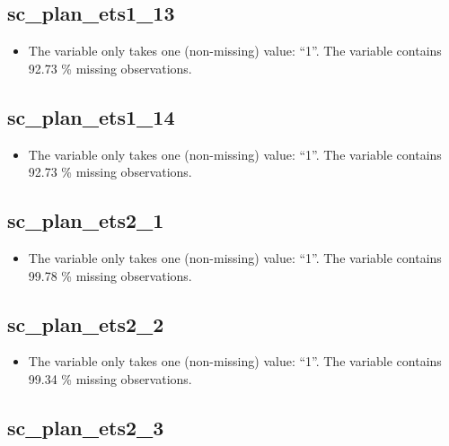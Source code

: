 \documentclass[
  letterpaper,
  DIV=11,
  numbers=noendperiod]{scrartcl}
\providecommand{\tightlist}{%
  \setlength{\itemsep}{0pt}\setlength{\parskip}{0pt}}
\begin{document}
\fullline

\subsection{sc\_plan\_ets1\_13}\label{sc_plan_ets1_13}

\begin{itemize}
\tightlist
\item
  The variable only takes one (non-missing) value: ``1''. The variable
  contains 92.73 \% missing observations.
\end{itemize}

\fullline

\subsection{sc\_plan\_ets1\_14}\label{sc_plan_ets1_14}

\begin{itemize}
\tightlist
\item
  The variable only takes one (non-missing) value: ``1''. The variable
  contains 92.73 \% missing observations.
\end{itemize}

\fullline

\subsection{sc\_plan\_ets2\_1}\label{sc_plan_ets2_1}

\begin{itemize}
\tightlist
\item
  The variable only takes one (non-missing) value: ``1''. The variable
  contains 99.78 \% missing observations.
\end{itemize}

\fullline

\subsection{sc\_plan\_ets2\_2}\label{sc_plan_ets2_2}

\begin{itemize}
\tightlist
\item
  The variable only takes one (non-missing) value: ``1''. The variable
  contains 99.34 \% missing observations.
\end{itemize}

\fullline

\subsection{sc\_plan\_ets2\_3}\label{sc_plan_ets2_3}
\end{document}

